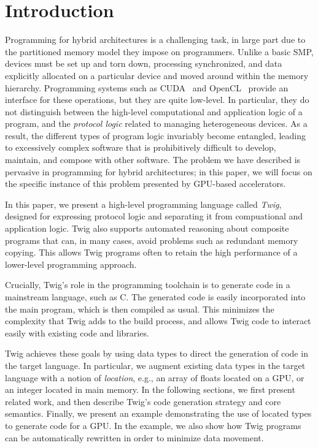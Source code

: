 
\section{Introduction}

Programming for hybrid architectures is a challenging task, in large part due to the partitioned memory model they impose on programmers. Unlike a basic SMP, devices must be set up and torn down, processing synchronized, and data explicitly allocated on a particular device and moved around within the memory hierarchy. Programming systems such as CUDA~\cite{cuda} and OpenCL~\cite{opencl} provide an interface for these operations, but they are quite low-level. In particular, they do not distinguish between the high-level computational and application logic of a program, and the \emph{protocol logic} related to managing heterogeneous devices. As a result, the different types of program logic invariably become entangled, leading to excessively complex software that is prohibitively difficult to develop, maintain, and compose with other software. The problem we have described is pervasive in programming for hybrid architectures; in this paper, we will focus on the specific instance of this problem presented by GPU-based accelerators.

In this paper, we present a high-level programming language called \emph{Twig}, designed for expressing protocol logic and separating it from compuational and application logic. Twig also  supports automated reasoning about composite programs that can, in many cases, avoid problems such as redundant memory copying. This allows Twig programs often to retain the high performance of a lower-level programming approach.

Crucially, Twig's role in the programming toolchain is to generate code in a mainstream language, such as C. The generated code is easily incorporated into the main program, which is then compiled as usual. This minimizes the complexity that Twig adds to the build process, and allows Twig code to interact easily with existing code and libraries.

Twig achieves these goals by using data types to direct the generation of code in the target language. In particular, we augment existing data types in the target language with a notion of \emph{location}, e.g., an array of floats located on a GPU, or an integer located in main memory. In the following sections, we first present related work, and then describe Twig's code generation strategy and core semantics. Finally, we present an example demonstrating the use of located types to generate code for a GPU. In the example, we also show how Twig programs can be automatically rewritten in order to minimize data movement.
